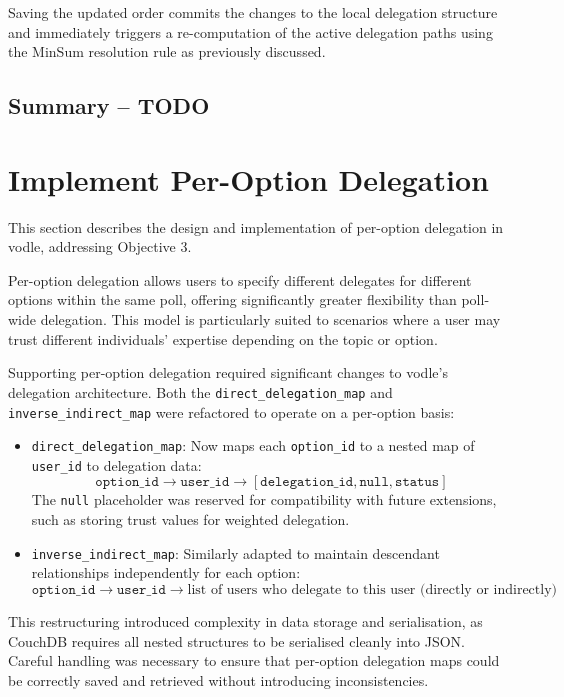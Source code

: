 Saving the updated order commits the changes to the local delegation structure and immediately triggers a re-computation of the active delegation paths using the MinSum resolution rule as previously discussed.

\subsection{Summary -- TODO}

\section{Implement Per-Option Delegation}
\label{sec:design_per_option_delegation}

This section describes the design and implementation of per-option delegation in vodle, addressing Objective 3.

Per-option delegation allows users to specify different delegates for different options within the same poll, offering significantly greater flexibility than poll-wide delegation. This model is particularly suited to scenarios where a user may trust different individuals' expertise depending on the topic or option.

Supporting per-option delegation required significant changes to vodle's delegation architecture. Both the \texttt{direct\_delegation\_map} and \texttt{inverse\_indirect\_map} were refactored to operate on a per-option basis:

\begin{itemize}
  \item \texttt{direct\_delegation\_map}: Now maps each \texttt{option\_id} to a nested map of \texttt{user\_id} to delegation data:
  \[
    \texttt{option\_id} \rightarrow \texttt{user\_id} \rightarrow [\texttt{delegation\_id}, \texttt{null}, \texttt{status}]
  \]
  The \texttt{null} placeholder was reserved for compatibility with future extensions, such as storing trust values for weighted delegation.

  \item \texttt{inverse\_indirect\_map}: Similarly adapted to maintain descendant relationships independently for each option:
  \[
    \texttt{option\_id} \rightarrow \texttt{user\_id} \rightarrow \text{list of users who delegate to this user (directly or indirectly)}
  \]
\end{itemize}

This restructuring introduced complexity in data storage and serialisation, as CouchDB requires all nested structures to be serialised cleanly into JSON. Careful handling was necessary to ensure that per-option delegation maps could be correctly saved and retrieved without introducing inconsistencies.

